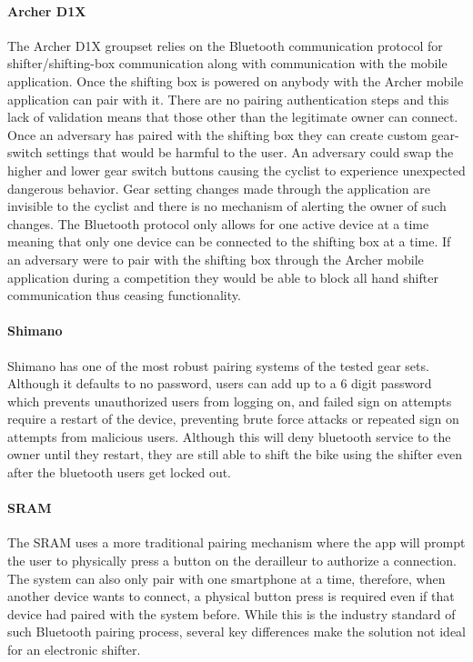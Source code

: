 \documentclass[letterpaper,twocolumn,10pt]{article}
\begin{document}
\paragraph{Archer D1X}
The Archer D1X groupset relies on the Bluetooth communication protocol for shifter/shifting-box communication along with communication with the mobile application. Once the shifting box is powered on anybody with the Archer mobile application can pair with it. There are no pairing authentication steps and this lack of validation means that those other than the legitimate owner can connect. Once an adversary has paired with the shifting box they can create custom gear-switch settings that would be harmful to the user. An adversary could swap the higher and lower gear switch buttons causing the cyclist to experience unexpected dangerous behavior. Gear setting changes made through the application are invisible to the cyclist and there is no mechanism of alerting the owner of such changes. The Bluetooth protocol only allows for one active device at a time meaning that only one device can be connected to the shifting box at a time. If an adversary were to pair with the shifting box through the Archer mobile application during a competition they would be able to block all hand shifter communication thus ceasing functionality.  

\paragraph{Shimano}
Shimano has one of the most robust pairing systems of the tested gear sets. Although it defaults to no password, users can add up to a 6 digit password which prevents unauthorized users from logging on, and failed sign on attempts require a restart of the device, preventing brute force attacks or repeated sign on attempts from malicious users. Although this will deny bluetooth service to the owner until they restart, they are still able to shift the bike using the shifter even after the bluetooth users get locked out.

\paragraph{SRAM}
The SRAM uses a more traditional pairing mechanism where the app will prompt the user to physically press a button on the derailleur to authorize a connection. The system can also only pair with one smartphone at a time, therefore, when another device wants to connect, a physical button press is required even if that device had paired with the system before. While this is the industry standard of such Bluetooth pairing process, several key differences make the solution not ideal for an electronic shifter.
\end{document}
